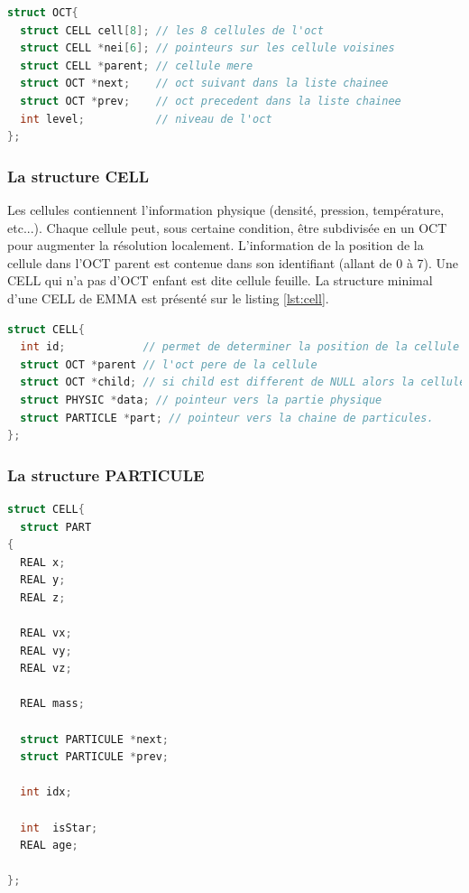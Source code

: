 \begin{lstlisting}[float=bth,language=C,frame=tb,caption={La structure OCT de EMMA},label=lst:oct]
struct OCT{
  struct CELL cell[8]; // les 8 cellules de l'oct
  struct CELL *nei[6]; // pointeurs sur les cellule voisines
  struct CELL *parent; // cellule mere
  struct OCT *next;    // oct suivant dans la liste chainee
  struct OCT *prev;    // oct precedent dans la liste chainee
  int level;           // niveau de l'oct
};
\end{lstlisting}

\subsubsection{La structure CELL}
\label{sec:CELL}
Les cellules contiennent l'information physique (densité, pression, température, etc...).
Chaque cellule peut, sous certaine condition, être subdivisée en un OCT pour augmenter la résolution localement.
L'information de la position de la cellule dans l'OCT parent est contenue dans son identifiant (allant de 0 à 7).
Une CELL qui n'a pas d'OCT enfant est dite cellule feuille.
La structure minimal d'une CELL de EMMA est présenté sur le listing \ref{lst:cell}.

\begin{lstlisting}[float=bth,language=C,frame=tb,caption={La structure CELL de EMMA},label=lst:cell]
struct CELL{
  int id;            // permet de determiner la position de la cellule dans l'oct
  struct OCT *parent // l'oct pere de la cellule
  struct OCT *child; // si child est different de NULL alors la cellule est raffinee et child point vers l'oct enfant
  struct PHYSIC *data; // pointeur vers la partie physique
  struct PARTICLE *part; // pointeur vers la chaine de particules.
};
\end{lstlisting}


\subsubsection{La structure PARTICULE}
\label{sec:PART}


\begin{lstlisting}[float=bth,language=C,frame=tb,caption={La structure PARTICULE de EMMA},label=lst:part]
struct CELL{
  struct PART
{
  REAL x;
  REAL y;
  REAL z;

  REAL vx;
  REAL vy;
  REAL vz;

  REAL mass;

  struct PARTICULE *next;
  struct PARTICULE *prev;

  int idx;

  int  isStar;
  REAL age;

};
\end{lstlisting}



